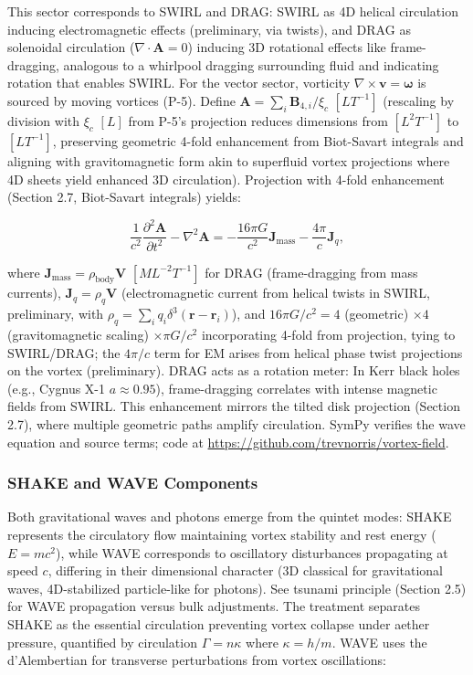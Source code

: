This sector corresponds to SWIRL and DRAG: SWIRL as 4D helical circulation inducing electromagnetic effects (preliminary, via twists), and DRAG as solenoidal circulation ($\nabla \cdot \mathbf{A} = 0$) inducing 3D rotational effects like frame-dragging, analogous to a whirlpool dragging surrounding fluid and indicating rotation that enables SWIRL. For the vector sector, vorticity $\nabla \times \mathbf{v} = \boldsymbol{\omega}$ is sourced by moving vortices (P-5). Define $\mathbf{A} = \sum_i \mathbf{B}_{4,i} / \xi_c$ $[L T^{-1}]$ (rescaling by division with $\xi_c$ $[L]$ from P-5's projection reduces dimensions from $[L^2 T^{-1}]$ to $[L T^{-1}]$, preserving geometric 4-fold enhancement from Biot-Savart integrals and aligning with gravitomagnetic form akin to superfluid vortex projections where 4D sheets yield enhanced 3D circulation). Projection with 4-fold enhancement (Section 2.7, Biot-Savart integrals) yields:

\begin{equation}
\frac{1}{c^2} \frac{\partial^2 \mathbf{A}}{\partial t^2} - \nabla^2 \mathbf{A} = -\frac{16\pi G}{c^2} \mathbf{J}_{\text{mass}} - \frac{4\pi}{c} \mathbf{J}_q,
\end{equation}

where $\mathbf{J}_{\text{mass}} = \rho_{\text{body}} \mathbf{V}$ $[M L^{-2} T^{-1}]$ for DRAG (frame-dragging from mass currents), $\mathbf{J}_q = \rho_q \mathbf{V}$ (electromagnetic current from helical twists in SWIRL, preliminary, with $\rho_q = \sum_i q_i \delta^3(\mathbf{r} - \mathbf{r}_i)$), and $16\pi G/c^2 = 4$ (geometric) $\times 4$ (gravitomagnetic scaling) $\times \pi G/c^2$ incorporating 4-fold from projection, tying to SWIRL/DRAG; the $4\pi/c$ term for EM arises from helical phase twist projections on the vortex (preliminary). DRAG acts as a rotation meter: In Kerr black holes (e.g., Cygnus X-1 $a\approx0.95$), frame-dragging correlates with intense magnetic fields from SWIRL. This enhancement mirrors the tilted disk projection (Section 2.7), where multiple geometric paths amplify circulation. SymPy verifies the wave equation and source terms; code at \url{https://github.com/trevnorris/vortex-field}.

\subsubsection{SHAKE and WAVE Components}

Both gravitational waves and photons emerge from the quintet modes: SHAKE represents the circulatory flow maintaining vortex stability and rest energy ($E = m c^2$), while WAVE corresponds to oscillatory disturbances propagating at speed $c$, differing in their dimensional character (3D classical for gravitational waves, 4D-stabilized particle-like for photons). See tsunami principle (Section 2.5) for WAVE propagation versus bulk adjustments. The treatment separates SHAKE as the essential circulation preventing vortex collapse under aether pressure, quantified by circulation $\Gamma = n \kappa$ where $\kappa = h / m$. WAVE uses the d'Alembertian for transverse perturbations from vortex oscillations:

